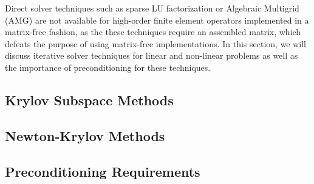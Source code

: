 Direct solver techniques such as sparse LU factorization or Algebraic Multigrid (AMG) are not available for high-order finite element operators implemented in a matrix-free fashion, as the these techniques require an assembled matrix, which defeats the purpose of using matrix-free implementations.
In this section, we will discuss iterative solver techniques for linear and non-linear problems as well as the importance of preconditioning for these techniques.

\subsection{Krylov Subspace Methods}


\subsection{Newton-Krylov Methods}


\subsection{Preconditioning Requirements}

